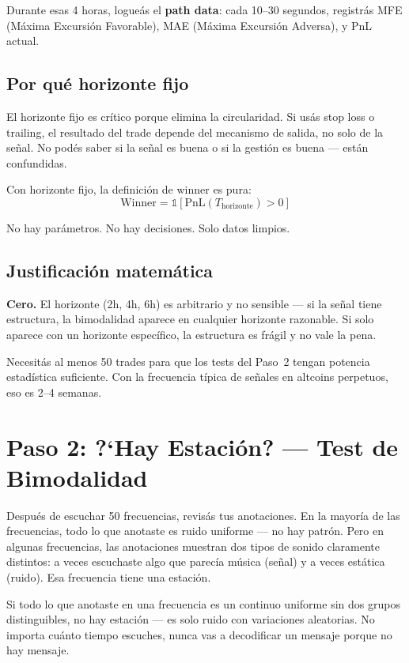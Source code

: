 \documentclass[11pt,a4paper]{article}
\begin{document}
Durante esas 4 horas, logue\'as el \textbf{path data}: cada 10--30
segundos, registr\'as MFE (M\'axima Excursi\'on Favorable), MAE (M\'axima
Excursi\'on Adversa), y PnL actual.

\subsection{Por qu\'e horizonte fijo}

El horizonte fijo es cr\'itico porque elimina la circularidad. Si us\'as
stop loss o trailing, el resultado del trade depende del mecanismo de
salida, no solo de la se\~nal. No pod\'es saber si la se\~nal es buena o
si la gesti\'on es buena --- est\'an confundidas.

Con horizonte fijo, la definici\'on de winner es pura:
\begin{equation}
\text{Winner} = \mathbb{1}[\text{PnL}(T_{\text{horizonte}}) > 0]
\end{equation}

No hay par\'ametros. No hay decisiones. Solo datos limpios.

\subsection{Justificaci\'on matem\'atica}

\begin{tcolorbox}[math, title=Par\'ametros de este paso]
\textbf{Cero.} El horizonte (2h, 4h, 6h) es arbitrario y no sensible ---
si la se\~nal tiene estructura, la bimodalidad aparece en cualquier
horizonte razonable. Si solo aparece con un horizonte espec\'ifico,
la estructura es fr\'agil y no vale la pena.
\end{tcolorbox}

Necesit\'as al menos 50 trades para que los tests del Paso~2 tengan
potencia estad\'istica suficiente. Con la frecuencia t\'ipica de se\~nales
en altcoins perpetuos, eso es 2--4 semanas.


\section{Paso 2: ?`Hay Estaci\'on? --- Test de Bimodalidad}
\label{sec:paso2}

\begin{tcolorbox}[radio, title=La radio: ?`hay estaci\'on?]
Despu\'es de escuchar 50 frecuencias, revis\'as tus anotaciones.
En la mayor\'ia de las frecuencias, todo lo que anotaste es ruido
uniforme --- no hay patr\'on. Pero en algunas frecuencias, las
anotaciones muestran dos tipos de sonido claramente distintos:
a veces escuchaste algo que parec\'ia m\'usica (se\~nal) y a veces
est\'atica (ruido). Esa frecuencia tiene una estaci\'on.

Si todo lo que anotaste en una frecuencia es un continuo uniforme
sin dos grupos distinguibles, no hay estaci\'on --- es solo ruido
con variaciones aleatorias. No importa cu\'anto tiempo escuches,
nunca vas a decodificar un mensaje porque no hay mensaje.
\end{tcolorbox}
\end{document}
